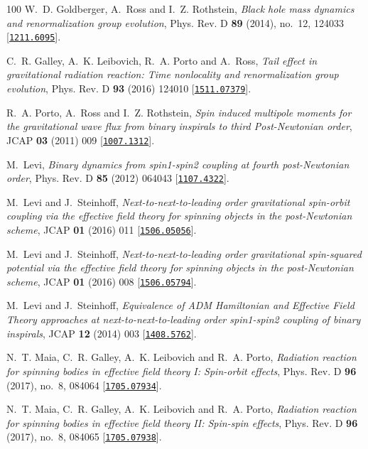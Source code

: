 \begin{thebibliography}{100}
W.~D. Goldberger, A.~Ross and I.~Z. Rothstein,  {\em {Black hole mass dynamics
  and renormalization group evolution}}, Phys. Rev. D {\bf 89} (2014), no.~12,
  124033 [\href{http://www.arXiv.org/abs/1211.6095}{{\tt 1211.6095}}].

C.~R. Galley, A.~K. Leibovich, R.~A. Porto and A.~Ross,  {\em {Tail effect in
  gravitational radiation reaction: Time nonlocality and renormalization group
  evolution}}, Phys. Rev. D {\bf 93} (2016) 124010
  [\href{http://www.arXiv.org/abs/1511.07379}{{\tt 1511.07379}}].

R.~A. Porto, A.~Ross and I.~Z. Rothstein,  {\em {Spin induced multipole moments
  for the gravitational wave flux from binary inspirals to third Post-Newtonian
  order}}, JCAP {\bf 03} (2011) 009
  [\href{http://www.arXiv.org/abs/1007.1312}{{\tt 1007.1312}}].

M.~Levi,  {\em {Binary dynamics from spin1-spin2 coupling at fourth
  post-Newtonian order}}, Phys. Rev. D {\bf 85} (2012) 064043
  [\href{http://www.arXiv.org/abs/1107.4322}{{\tt 1107.4322}}].

M.~Levi and J.~Steinhoff,  {\em {Next-to-next-to-leading order gravitational
  spin-orbit coupling via the effective field theory for spinning objects in
  the post-Newtonian scheme}}, JCAP {\bf 01} (2016) 011
  [\href{http://www.arXiv.org/abs/1506.05056}{{\tt 1506.05056}}].

M.~Levi and J.~Steinhoff,  {\em {Next-to-next-to-leading order gravitational
  spin-squared potential via the effective field theory for spinning objects in
  the post-Newtonian scheme}}, JCAP {\bf 01} (2016) 008
  [\href{http://www.arXiv.org/abs/1506.05794}{{\tt 1506.05794}}].

M.~Levi and J.~Steinhoff,  {\em {Equivalence of ADM Hamiltonian and Effective
  Field Theory approaches at next-to-next-to-leading order spin1-spin2 coupling
  of binary inspirals}}, JCAP {\bf 12} (2014) 003
  [\href{http://www.arXiv.org/abs/1408.5762}{{\tt 1408.5762}}].

N.~T. Maia, C.~R. Galley, A.~K. Leibovich and R.~A. Porto,  {\em {Radiation
  reaction for spinning bodies in effective field theory I: Spin-orbit
  effects}}, Phys. Rev. D {\bf 96} (2017), no.~8, 084064
  [\href{http://www.arXiv.org/abs/1705.07934}{{\tt 1705.07934}}].

N.~T. Maia, C.~R. Galley, A.~K. Leibovich and R.~A. Porto,  {\em {Radiation
  reaction for spinning bodies in effective field theory II: Spin-spin
  effects}}, Phys. Rev. D {\bf 96} (2017), no.~8, 084065
  [\href{http://www.arXiv.org/abs/1705.07938}{{\tt 1705.07938}}].


\end{thebibliography}
